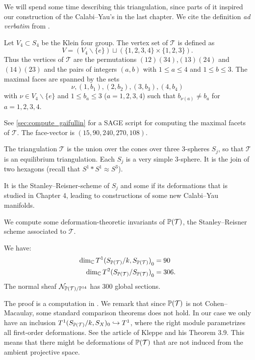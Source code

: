  We will spend some time describing this triangulation, since parts of it inspired our construction of the Calabi--Yau's in the last chapter. We cite the definition \emph{ad verbatim} from \cite{cp2_15_chess}. 

 \begin{definition}
 Let $V_4 \subset S_4$ be the Klein four group. The vertex set of $\mathcal T$ is defined as
\[
 V = (V_4 \backslash \{e \}) \sqcup \left( \{1,2,3,4 \} \times \{ 1,2,3 \} \right).
\]
 Thus the vertices of $\mathcal T$ are the permutations $(12)(34)$,$(13)(24)$ and $(14)(23)$ and the pairs of integers $(a,b)$ with $1 \leq a \leq 4$ and $1 \leq b \leq 3$. The maximal faces are spanned by the sets 
\[
 \nu, (1,b_1), (2,b_2), (3,b_3), (4,b_4)
\]
 with $\nu \in V_4 \backslash \{ e \}$ and $1 \leq b_a \leq 3$ ($a=1,2,3,4$) such that $b_{\nu(a)} \neq b_a$ for $a=1,2,3,4$.
 \end{definition}

See \cref{sec:compute_gaifullin} for a SAGE \cite{sagemath} script for computing the maximal facets of $\mathcal T$. The face-vector is $(15,90,240,270,108)$.

The triangulation $\mathcal T$ is the union over the cones over three $3$-spheres $S_j$, so that $\mathcal T$ is an equilibrium triangulation. Each $S_j$ is a very simple $3$-sphere. It is the join of two hexagons (recall that $S^1 \ast S^1 \approx S^3$).

\begin{remark}
  It is the Stanley--Reisner-scheme of $S_j$ and some if its
  deformations that is studied in Chapter 4, leading to constructions
  of some new Calabi--Yau manifolds.
\end{remark}

We compute some deformation-theoretic invariants of $\P(\mathcal T)$, the Stanley--Reisner scheme associated to $\mathcal T$.

\begin{proposition}
We have: 
\begin{align*} 
    \label{eq:t1dims_triang}
\dim_\C  {T^1(S_{\P(\mathcal T)}/k, S_{\P(\mathcal T)})}_0 &= 90 \\ 
\dim_\C {T^2(S_{\P(\mathcal T)}/S_{\P(\mathcal T)})}_0     &= 306.
\end{align*}
The normal sheaf $\mathcal N_{\P(\mathcal T)/\P^{14}}$ has $300$ global sections.
\end{proposition}

The proof is a computation in \MM. We remark that since $\P(\mathcal T)$ is not Cohen--Macaulay, some standard comparison theorems does not hold. In our case we only have an inclusion $T^1(S_{\P(\mathcal T)}/k,S_X)_0 \hookrightarrow T^1$, where the right module parametrizes all first-order deformations. See the article of Kleppe \cite{kleppe_deformations} and his Theorem 3.9. This means that there might be deformations of $\P(\mathcal T)$ that are not induced from the ambient projective space.

